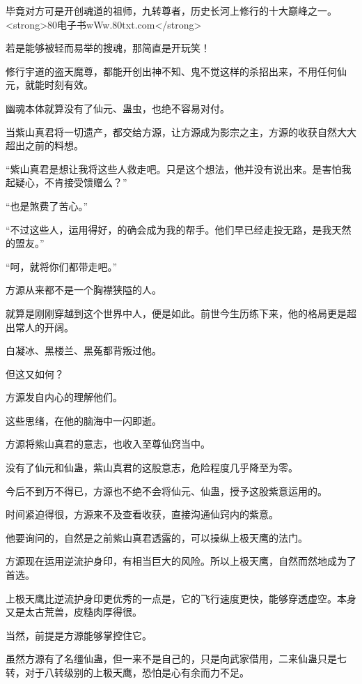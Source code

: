 
\begin{this_body}

毕竟对方可是开创魂道的祖师，九转尊者，历史长河上修行的十大巅峰之一。<strong>80电子书wWw.80txt.com</strong>

若是能够被轻而易举的搜魂，那简直是开玩笑！

修行宇道的盗天魔尊，都能开创出神不知、鬼不觉这样的杀招出来，不用任何仙元，就能时刻有效。

幽魂本体就算没有了仙元、蛊虫，也绝不容易对付。

当紫山真君将一切遗产，都交给方源，让方源成为影宗之主，方源的收获自然大大超出之前的料想。

“紫山真君是想让我将这些人救走吧。只是这个想法，他并没有说出来。是害怕我起疑心，不肯接受馈赠么？”

“也是煞费了苦心。”

“不过这些人，运用得好，的确会成为我的帮手。他们早已经走投无路，是我天然的盟友。”

“呵，就将你们都带走吧。”

方源从来都不是一个胸襟狭隘的人。

就算是刚刚穿越到这个世界中人，便是如此。前世今生历练下来，他的格局更是超出常人的开阔。

白凝冰、黑楼兰、黑菟都背叛过他。

但这又如何？

方源发自内心的理解他们。

这些思绪，在他的脑海中一闪即逝。

方源将紫山真君的意志，也收入至尊仙窍当中。

没有了仙元和仙蛊，紫山真君的这股意志，危险程度几乎降至为零。

今后不到万不得已，方源也不绝不会将仙元、仙蛊，授予这股紫意运用的。

时间紧迫得很，方源来不及查看收获，直接沟通仙窍内的紫意。

他要询问的，自然是之前紫山真君透露的，可以操纵上极天鹰的法门。

方源现在运用逆流护身印，有相当巨大的风险。所以上极天鹰，自然而然地成为了首选。

上极天鹰比逆流护身印更优秀的一点是，它的飞行速度更快，能够穿透虚空。本身又是太古荒兽，皮糙肉厚得很。

当然，前提是方源能够掌控住它。

虽然方源有了名缰仙蛊，但一来不是自己的，只是向武家借用，二来仙蛊只是七转，对于八转级别的上极天鹰，恐怕是心有余而力不足。


\end{this_body}
